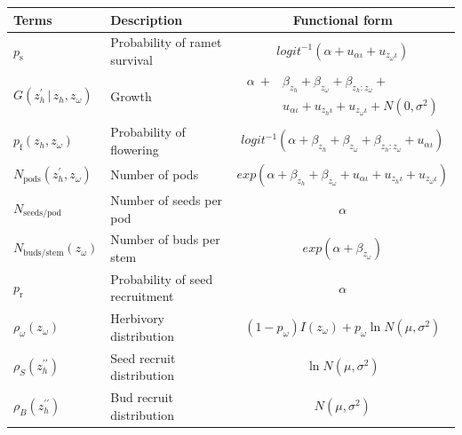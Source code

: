 \documentclass[10pt]{article}
\begin{document}
\begin{framed}
\centering
\begin{tabular}{ |l|l|c| }
\hline
\rowcolor{mygray} 
Terms & Description & Functional form \\ \hline
$p_{\mathrm{s}}$ & Probability of ramet survival & $logit^{-1}(\alpha + u_{\alpha\iota} + u_{z_{\omega}\iota})$ \\
$G(z_{h}^{\prime}\, | \, z_{h},z_{\omega})$ & Growth & $\begin{array}{ll}\alpha \ + & \!\!\!\beta_{z_{h}} + \beta_{z_{\omega}} + \beta_{z_{h}:z_{\omega}} + \\ & \!\!\!u_{\alpha\iota} + u_{z_{h}\iota} + u_{z_{\omega}\iota} + N(0,\sigma^2)\end{array}$ \\
$p_{\mathrm{f}}(z_{h},z_{\omega})$ & Probability of flowering & $logit^{-1}(\alpha + \beta_{z_{h}} + \beta_{z_{\omega}} + \beta_{z_{h}:z_{\omega}} + u_{\alpha\iota})$ \\ 
$N_{\mathrm{pods}}\left(z_{h}^{\prime},z_{\omega}\right)$ & Number of pods & $exp(\alpha + \beta_{z_{h}} + \beta_{z_{\omega}} + u_{\alpha\iota} + u_{z_{h}\iota} + u_{z_{\omega}\iota})$ \\ 
$N_{\mathrm{seeds/pod}}$ & Number of seeds per pod & $\alpha$ \\
$N_{\mathrm{buds/stem}}(z_{\omega})$ & Number of buds per stem & $exp(\alpha + \beta_{z_{\omega}})$ \\ 
$p_{\mathrm{r}}$ & Probability of seed recruitment & $\alpha$ \\
$\rho_{\omega}(z_{\omega})$ & Herbivory distribution & $(1-p_{\omega})I(z_{\omega}) + p_{\omega}\ln N(\mu, \sigma^2)$ \\
$\rho_{S}(z_{h}^{\prime\prime})$ & Seed recruit distribution & $\ln N(\mu, \sigma^2)$ \\
$\rho_{B}(z_{h}^{\prime\prime})$ & Bud recruit distribution & $N(\mu, \sigma^2)$ \\
\hline
\end{tabular}

\end{framed}
\end{document}
